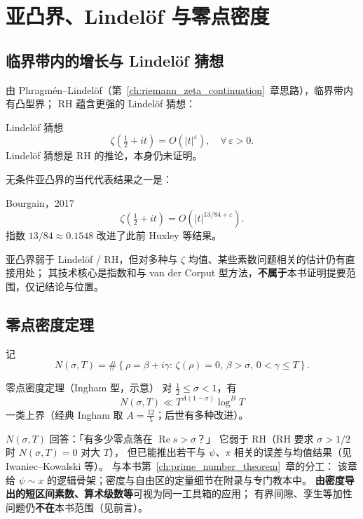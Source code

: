 \section{亚凸界、Lindelöf 与零点密度}

\subsection{临界带内的增长与 Lindelöf 猜想}

由 Phragmén--Lindelöf（第~\ref{ch:riemann_zeta_continuation}~章思路），临界带内有凸型界；
RH 蕴含更强的 Lindelöf 猜想：

\begin{definition}{Lindelöf 猜想}{}
\[
  \zeta\!\left(\tfrac{1}{2}+it\right) = O\!\left(|t|^\varepsilon\right),
  \quad \forall\,\varepsilon>0.
\]
Lindelöf 猜想是 RH 的推论，本身仍未证明。
\end{definition}

无条件亚凸界的当代代表结果之一是：

\begin{theorem}{Bourgain，2017}{}
\[
  \zeta\!\left(\tfrac{1}{2}+it\right) = O\!\left(|t|^{13/84+\varepsilon}\right).
\]
指数 $13/84 \approx 0.1548$ 改进了此前 Huxley 等结果。
\end{theorem}

亚凸界弱于 Lindelöf / RH，但对多种与 $\zeta$ 均值、某些素数问题相关的估计仍有直接用处；
其技术核心是指数和与 van der Corput 型方法，\textbf{不属于}本书证明提要范围，仅记结论与位置。

\subsection{零点密度定理}

记
\[
  N(\sigma, T) = \#\!\left\{\rho = \beta+i\gamma:\,\zeta(\rho)=0,\,
  \beta>\sigma,\,0<\gamma\leq T\right\}.
\]

\begin{theorem}{零点密度定理（Ingham 型，示意）}{}
对 $\tfrac{1}{2}\leq\sigma<1$，有
\[
  N(\sigma,T) \ll T^{A(1-\sigma)}\log^B T
\]
一类上界（经典 Ingham 取 $A=\tfrac{12}{5}$；后世有多种改进）。
\end{theorem}

$N(\sigma,T)$ 回答：「有多少零点落在 $\operatorname{Re}s>\sigma$？」
它弱于 RH（RH 要求 $\sigma>1/2$ 时 $N(\sigma,T)=0$ 对大 $T$），
但已能推出若干与 $\psi$、$\pi$ 相关的误差与均值结果（见 Iwaniec--Kowalski 等）。
与本书第~\ref{ch:prime_number_theorem}~章的分工：
该章给 $\psi\sim x$ 的逻辑骨架；密度与自由区的定量细节在附录与专门教本中。
\textbf{由密度导出的短区间素数、算术级数等}可视为同一工具箱的应用；
有界间隙、孪生等加性问题仍\textbf{不在}本书范围（见前言）。

